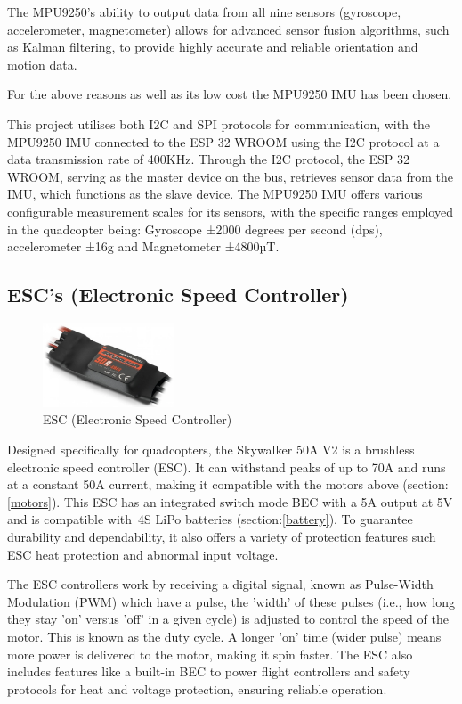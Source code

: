 \documentclass{article}
\begin{document}
The MPU9250's ability to output data from all nine sensors (gyroscope, accelerometer, magnetometer) allows for advanced sensor fusion algorithms, such as Kalman filtering, to provide highly accurate and reliable orientation and motion data.

For the above reasons as well as its low cost the MPU9250 IMU has been chosen.

This project utilises both I2C and SPI protocols for communication, with the MPU9250 IMU connected to the ESP 32 WROOM using the I2C protocol at a data transmission rate of 400KHz. Through the I2C protocol, the ESP 32 WROOM, serving as the master device on the bus, retrieves sensor data from the IMU, which functions as the slave device. The MPU9250 IMU offers various configurable 
measurement scales for its sensors, with the specific ranges employed in the quadcopter being: Gyroscope ±2000 degrees per second (dps), accelerometer ±16g and Magnetometer ±4800µT.

\subsection{ESC's (Electronic Speed Controller)}\label{esc}
\begin{figure}[H]
  \centering
  \includegraphics[width=0.35\textwidth]{Pictures/esc.png}
  \caption{ESC (Electronic Speed Controller)}
  \label{fig:esc}
\end{figure}
Designed specifically for quadcopters, the Skywalker 50A V2 is a brushless electronic speed controller (ESC). It can withstand peaks of up to 70A and runs at a constant 50A current, making it compatible with the motors above (section:\ref{motors}). This ESC has an integrated switch mode BEC with a 5A output at 5V and is compatible with 4S LiPo 
batteries (section:\ref{battery}). To guarantee durability and dependability, it also offers a variety of protection features such ESC heat protection and abnormal input voltage.

The ESC controllers work by receiving a digital signal, known as Pulse-Width Modulation (PWM) which have a pulse, the ’width’ of these pulses (i.e., how long they stay ’on’ versus ’off’ in a given cycle) is adjusted to control the speed of the motor. This is known as the duty cycle.
A longer ’on’ time (wider pulse) means more power is delivered to the motor, making it spin faster. The ESC also includes features like a built-in BEC to power flight controllers and safety protocols for heat and voltage protection, ensuring reliable operation.
\end{document}
